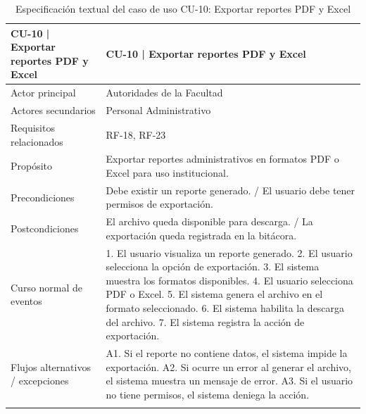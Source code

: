 \begingroup
\small
\begin{longtable}{|p{7.8cm}|p{7.8cm}|}
\hline
CU-10 | Exportar reportes PDF y Excel & CU-10 | Exportar reportes PDF y Excel \\ \hline
Actor principal & Autoridades de la Facultad \\ \hline
Actores secundarios & Personal Administrativo \\ \hline
Requisitos relacionados & RF-18, RF-23 \\ \hline
Propósito & Exportar reportes administrativos en formatos PDF o Excel para uso institucional. \\ \hline
Precondiciones & Debe existir un reporte generado. / El usuario debe tener permisos de exportación. \\ \hline
Postcondiciones & El archivo queda disponible para descarga. / La exportación queda registrada en la bitácora. \\ \hline
Curso normal de eventos & 1. El usuario visualiza un reporte generado. 2. El usuario selecciona la opción de exportación. 3. El sistema muestra los formatos disponibles. 4. El usuario selecciona PDF o Excel. 5. El sistema genera el archivo en el formato seleccionado. 6. El sistema habilita la descarga del archivo. 7. El sistema registra la acción de exportación. \\ \hline
Flujos alternativos / excepciones & A1. Si el reporte no contiene datos, el sistema impide la exportación. A2. Si ocurre un error al generar el archivo, el sistema muestra un mensaje de error. A3. Si el usuario no tiene permisos, el sistema deniega la acción. \\ \hline
\caption{Especificación textual del caso de uso CU-10: Exportar reportes PDF y Excel}
\end{longtable}
\endgroup

